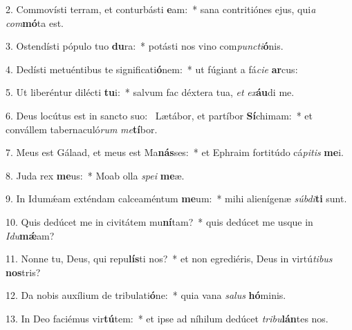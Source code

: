 2. Commovísti terram, et conturbásti \textbf{e}am:~*  sana contritiónes ejus, qui\textit{a} \textit{com}\textbf{mó}ta est.\

3. Ostendísti pópulo tuo \textbf{du}ra:~*  potásti nos vino com\textit{punc}\textit{ti}\textbf{ó}nis.\

4. Dedísti metuéntibus te significati\textbf{ó}nem:~*  ut fúgiant a fá\textit{ci}\textit{e} \textbf{ar}cus:\

5. Ut liberéntur dilécti \textbf{tu}i:~*  salvum fac déxtera tua, \textit{et} \textit{ex}\textbf{áu}di me.\

6. Deus locútus est in sancto suo: \dag\  Lætábor, et partíbor \textbf{Sí}chimam:~*  et convállem tabernaculó\textit{rum} \textit{me}\textbf{tí}bor.\

7. Meus est Gálaad, et meus est Ma\textbf{nás}ses:~*  et Ephraim fortitúdo cá\textit{pi}\textit{tis} \textbf{me}i.\

8. Juda rex \textbf{me}us:~*  Moab olla \textit{spe}\textit{i} \textbf{me}æ.\

9. In Idumǽam exténdam calceaméntum \textbf{me}um:~*  mihi alienígenæ \textit{súb}\textit{di}\textbf{ti} sunt.\

10. Quis dedúcet me in civitátem mu\textbf{ní}tam?~*  quis dedúcet me usque in \textit{I}\textit{du}\textbf{mǽ}am?\

11. Nonne tu, Deus, qui repu\textbf{lís}ti nos?~*  et non egrediéris, Deus in virtú\textit{ti}\textit{bus} \textbf{nos}tris?\

12. Da nobis auxílium de tribulati\textbf{ó}ne:~*  quia vana \textit{sa}\textit{lus} \textbf{hó}minis.\

13. In Deo faciémus vir\textbf{tú}tem:~*  et ipse ad níhilum dedúcet \textit{tri}\textit{bu}\textbf{lán}tes nos.\

